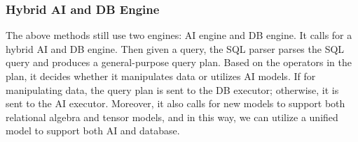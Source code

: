 \subsubsection{Hybrid AI and DB Engine}
\label{subsubsec: engine}

The above methods still use two engines: AI engine and DB engine. It calls for a hybrid AI and DB engine. Then given a query, the SQL parser parses the SQL query and produces a general-purpose query plan. Based on the operators in the plan, it decides whether it manipulates data or utilizes AI models. If for manipulating data, the query plan is sent to the DB executor; otherwise, it is sent to the AI executor. Moreover, it also calls for new models to support both relational algebra and tensor models, and in this way, we can utilize a unified model to support both AI and database. 














